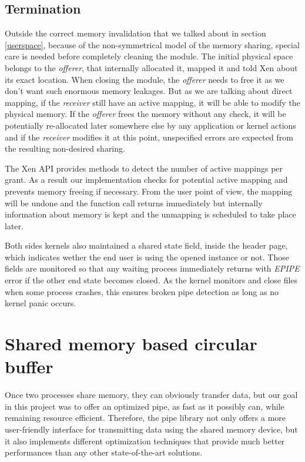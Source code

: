 \documentclass[journal]{IEEEtran}
\begin{document}
\subsection{Termination}
\label{Termination}

Outside the correct memory invalidation that we talked about in section \ref{userspace}, because of the non-symmetrical model of the memory sharing, special care is needed before completely cleaning the module. The initial physical space belongs to the \emph{offerer}, that internally allocated it, mapped it and told Xen about its exact location. When closing the module, the \emph{offerer} needs to free it as we don't want such enormous memory leakages. But as we are talking about direct mapping, if the \emph{receiver} still have an active mapping, it will be able to modify the physical memory.
If the \emph{offerer} frees the memory without any check, it will be potentially re-allocated later somewhere else by any application or kernel actions and if the \emph{receiver} modifies it at this point, unspecified errors are expected from the resulting non-desired sharing.

The Xen API provides methods to detect the number of active mappings per grant. As a result our implementation checks for potential active mapping and prevents memory freeing if necessary. From the user point of view, the mapping will be undone and the function call returns immediately but internally information about memory is kept and the unmapping is scheduled to take place later.

Both sides kernels also maintained a shared state field, inside the header page, which indicates wether the end user is using the opened instance or not. Those fields are monitored so that any waiting process immediately returns with \emph{EPIPE} error if the other end state becomes closed. As the kernel monitors and close files when some process crashes, this ensures broken pipe detection as long as no kernel panic occurs.


\section{Shared memory based circular buffer}

Once two processes share memory, they can obviously transfer data, but our goal in this project was to offer an optimized pipe, as fast as it possibly can, while remaining resource efficient. Therefore, the pipe library not only offers a more user-friendly interface for transmitting data using the shared memory device, but it also implements different optimization techniques that provide much better performances than any other state-of-the-art solutions. 
\end{document}
